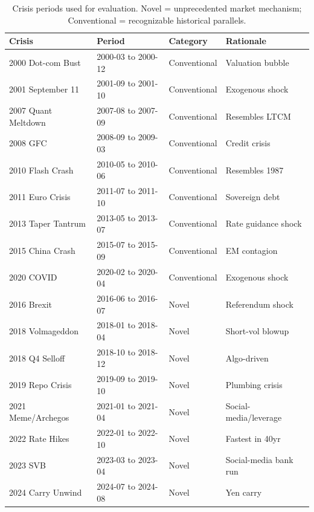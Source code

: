 \documentclass[3p]{elsarticle}
\begin{document}
\begin{table}[htb]
\centering
\caption{Crisis periods used for evaluation.  Novel = unprecedented
  market mechanism; Conventional = recognizable historical parallels.}
\label{tab:crises}
\small
\begin{tabular}{llll}
\toprule
Crisis & Period & Category & Rationale \\
\midrule
2000 Dot-com Bust     & 2000-03 to 2000-12 & Conventional & Valuation bubble \\
2001 September 11     & 2001-09 to 2001-10 & Conventional & Exogenous shock \\
2007 Quant Meltdown   & 2007-08 to 2007-09 & Conventional & Resembles LTCM \\
2008 GFC              & 2008-09 to 2009-03 & Conventional & Credit crisis \\
2010 Flash Crash      & 2010-05 to 2010-06 & Conventional & Resembles 1987 \\
2011 Euro Crisis      & 2011-07 to 2011-10 & Conventional & Sovereign debt \\
2013 Taper Tantrum    & 2013-05 to 2013-07 & Conventional & Rate guidance shock \\
2015 China Crash      & 2015-07 to 2015-09 & Conventional & EM contagion \\
2020 COVID            & 2020-02 to 2020-04 & Conventional & Exogenous shock \\
\midrule
2016 Brexit           & 2016-06 to 2016-07 & Novel & Referendum shock \\
2018 Volmageddon      & 2018-01 to 2018-04 & Novel & Short-vol blowup \\
2018 Q4 Selloff       & 2018-10 to 2018-12 & Novel & Algo-driven \\
2019 Repo Crisis      & 2019-09 to 2019-10 & Novel & Plumbing crisis \\
2021 Meme/Archegos    & 2021-01 to 2021-04 & Novel & Social-media/leverage \\
2022 Rate Hikes       & 2022-01 to 2022-10 & Novel & Fastest in 40yr \\
2023 SVB              & 2023-03 to 2023-04 & Novel & Social-media bank run \\
2024 Carry Unwind     & 2024-07 to 2024-08 & Novel & Yen carry \\
\bottomrule
\end{tabular}
\end{table}

\end{document}

